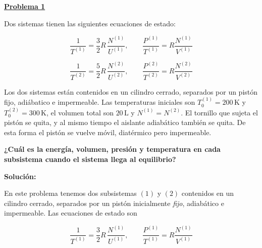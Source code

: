 \documentclass{article}
\newenvironment{AGbox}[1][7]%
{%
  \begin{tcolorbox}[
    enhanced, breakable,
    colframe=AppleGreen,
    colback=AppleGreen!#1,
    boxrule=1pt,
    borderline west={2mm}{-10mm}{AppleGreen},
    sharp corners=southwest,
    left=14pt,right=14pt,top=10pt,bottom=10pt,
     boxsep=6pt,
  ]%
}{%
  \end{tcolorbox}%
}
\begin{document}


\begin{AGbox}[8]
\textcolor{Apple Green}{\textbf{\underline{Problema 1}}} \vspace{2mm}

Dos sistemas tienen las siguientes ecuaciones de estado:

\begin{equation}
\frac{1}{T^{(1)}} = \frac{3}{2}R\,\frac{N^{(1)}}{U^{(1)}}, 
\qquad
\frac{P^{(1)}}{T^{(1)}} = R\frac{N^{(1)}}{V^{(1)}} 
\label{eq:P1_EOS1}
\end{equation}

\begin{equation}
\frac{1}{T^{(2)}} = \frac{5}{2}R\,\frac{N^{(2)}}{U^{(2)}}, 
\qquad
\frac{P^{(2)}}{T^{(2)}} = R\frac{N^{(2)}}{V^{(2)}}
\label{eq:P1_EOS2}
\end{equation}

Los dos sistemas están contenidos en un cilindro cerrado, separados por un pistón fijo, adiábatico e impermeable.  
Las temperaturas iniciales son \(T^{(1)}_0 = 200\,\mathrm{K}\) y \(T^{(2)}_0 = 300\,\mathrm{K}\), el volumen total son \(20\,\mathrm{L}\) y 
\(N^{(1)} = N^{(2)}\).  
El tornillo que sujeta el pistón se quita, y al mismo tiempo el aislante adiabático también se quita.  
De esta forma el pistón se vuelve móvil, diatérmico pero impermeable.  

\textbf{¿Cuál es la energía, volumen, presión y temperatura en cada subsistema cuando el sistema llega al equilibrio?}

\end{AGbox}
\vspace{0.5cm}

\textcolor{Tuscany}{\textbf{Solución:}}

En este problema tenemos dos subsistemas \( (1) \) y \( (2) \) contenidos en un
cilindro cerrado, separados por un pistón inicialmente \emph{fijo}, adiabático e
impermeable. Las ecuaciones de estado son

\begin{equation}
\frac{1}{T^{(1)}} = \frac{3}{2}R\,\frac{N^{(1)}}{U^{(1)}},
\qquad
\frac{P^{(1)}}{T^{(1)}} = R\frac{N^{(1)}}{V^{(1)}}
\label{eq:solP1_EOS1}
\end{equation}
\end{document}
